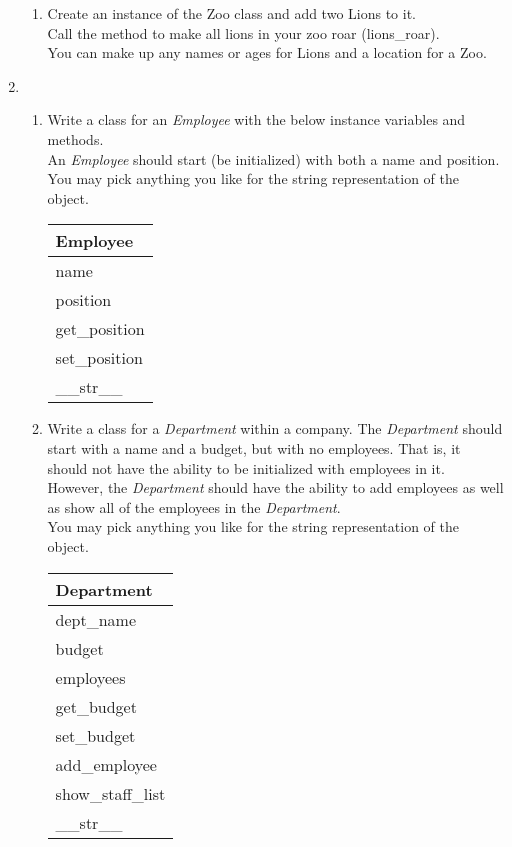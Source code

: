 \documentclass{article}
\begin{document}
\begin{enumerate}
\begin{enumerate}
		\item
			Create an instance of the Zoo class and add two Lions to it.\\
			Call the method to make all lions in your zoo roar (lions\_roar).\\
			You can make up any names or ages for Lions and a location for a Zoo.\\
	\end{enumerate}
\pagebreak


	\item 
	\begin{enumerate}
		\item 
			Write a class for an \textit{Employee} with the below instance variables and methods.\\
			An \textit{Employee} should start (be initialized) with both a name and position.\\
			You may pick anything you like for the string representation of the object.
			\begin{flushright}
			\begin{tabular}{|l|} \hline
				Employee\\ \hline
				name\\ position\\ \hline
				get\_position\\ set\_position\\ \_\_str\_\_ \\ \hline
			\end{tabular}
			\end{flushright}
		
		\item 
			Write a class for a \textit{Department} within a company. The \textit{Department} should 
			start with a name and a budget, but with no employees. That is, it should not have the ability to be
			initialized with employees in it. However, the \textit{Department} should have the ability to add 
			employees as well as show all of the employees in the \textit{Department}.\\
			You may pick anything you like for the string representation of the object.
			\begin{flushright}
			\begin{tabular}{|l|} \hline 
				Department\\ \hline
				dept\_name\\ budget\\ employees\\ \hline
				get\_budget\\ set\_budget\\ add\_employee\\ show\_staff\_list\\ 
					\_\_str\_\_ \\ \hline
			\end{tabular}
			\end{flushright}


\end{enumerate}
\end{enumerate}
\end{document}
